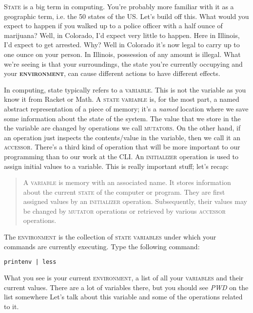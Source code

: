 \documentclass[]{tufte-handout}
\begin{document}
\textsc{State} is a big term in computing. You're probably more familiar with it as a geographic term, i.e. the 50 states of the US. Let's build off this. What would you expect to happen if you walked up to a police officer with a half ounce of marijuana? Well, in Colorado, I'd expect very little to happen. Here in Illinois, I'd expect to get arrested. Why? Well in Colorado it's now legal to carry up to one ounce on your person. In Illinois, possession of any amount is illegal. What we're seeing is that your surroundings, the state you're currently occupying and your \textbf{\textsc{environment}}, can cause different actions to have different effects.  

In computing, state typically refers to a \textsc{variable}.  This is not the variable as you know it from Racket or Math. A \textsc{state variable} is, for the most part, a named abstract representation of a piece of memory; it's a \textit{named} location where we save some information about the state of the system. The value that we store in the the variable are changed by operations we call \textsc{mutators}.  On the other hand, if an operation just inspects the contents/value in the variable, then we call it an \textsc{accessor}. There's a third kind of operation that will be more important to our programming than to our work at the CLI.  An \textsc{initializer} operation is used to assign initial values to a variable. This is really important stuff; let's recap:

\begin{quote}
A \textsc{variable} is memory with an associated name.  It stores information about the current \textsc{state} of the computer or program.  They are first assigned values by an \textsc{initializer} operation. Subsequently, their values may be changed by \textsc{mutator} operations or retrieved by various \textsc{accessor} operations. 
\end{quote}


The \textsc{environment} is the collection of \textsc{state variables} under which your commands are currently executing. Type the following command:
\begin{verbatim}
printenv | less
\end{verbatim}
What you see is your current \textsc{environment}, a list of all your \textsc{variables} and their current values. There are a lot of variables there, but you should see \textit{PWD} on the list somewhere  Let's talk about this variable and some of the operations related to it. 
\end{document}
